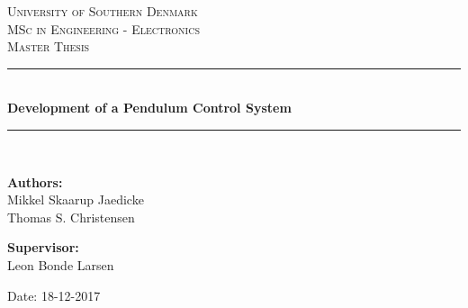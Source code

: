 \begin{titlepage}
\begin{center}

\textsc{\LARGE University of Southern Denmark}\\[1.5cm]
\textsc{\Large MSc in Engineering - Electronics}\\
\textsc{\large Master Thesis}\\[0.5cm]

\vfill
\vspace{3cm}
\hrule ~\\[0.3cm]
{ \LARGE \bfseries Development of a Pendulum Control System\\[0.4cm] }
\hrule ~\\[1.5cm]

\vfill

\vspace{5cm}
\begin{minipage}[t]{.55\textwidth}
\begin{flushleft} \large
\textbf{Authors:}\\
Mikkel Skaarup Jaedicke\\
Thomas S. Christensen
\end{flushleft}
\end{minipage}
\begin{minipage}[t]{.44\textwidth}
\begin{flushright} \large
\textbf{Supervisor:} \\
Leon Bonde Larsen
\end{flushright}
\end{minipage}

\vspace{1cm}
Date: 18-12-2017

\vspace{1cm}

\end{center}
\end{titlepage}